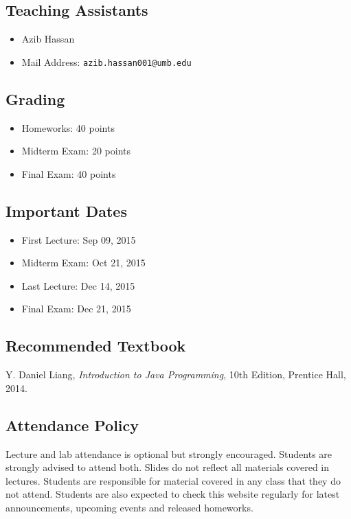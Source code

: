 \documentclass[12pt,letterpaper,twoside]{article}
\begin{document}
\subsection*{Teaching Assistants}
\begin{itemize}
\item[] Azib Hassan
\item[] Mail Address: \texttt{azib.hassan001@umb.edu}
\end{itemize}

\subsection*{Grading}
\begin{itemize}
\item[] Homeworks: 40 points
\item[] Midterm Exam: 20 points
\item[] Final Exam: 40 points
\end{itemize}

\subsection*{Important Dates}
\begin{itemize}
\item[] First Lecture: Sep 09, 2015
\item[] Midterm Exam: Oct 21, 2015
\item[] Last Lecture: Dec 14, 2015
\item[] Final Exam: Dec 21, 2015
\end{itemize}

\subsection*{Recommended Textbook}
Y. Daniel Liang, \textit{Introduction to Java Programming}, 10th Edition, Prentice Hall, 2014.

\subsection*{Attendance Policy}
Lecture and lab attendance is optional but strongly encouraged. Students are strongly advised to attend both. Slides do not reﬂect all materials covered in lectures. Students are responsible for material covered in any class that they do not attend. Students are also expected to check this website regularly for latest announcements, upcoming events and released homeworks.
\end{document}
